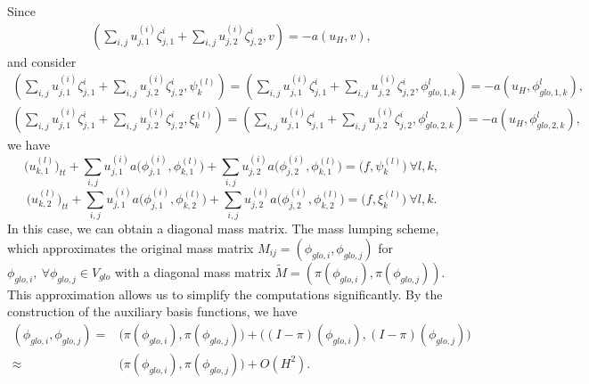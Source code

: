 \documentclass[preprint,12pt]{elsarticle}
\newcommand{\sff}[1]{{\color{orange}{#1}}}
\begin{document}
Since 
\begin{equation}\label{ml3}
\begin{aligned}
    \left(\sum_{i,j}u_{j,1}^{(i)}\zeta_{j,1}^i+\sum_{i,j}u_{j,2}^{(i)}\zeta_{j,2}^i,v\right)=-a(u_H,v),
\end{aligned}
\end{equation}
and consider
\begin{equation}\label{ml4}
\begin{aligned}
    \left(\sum_{i,j}u_{j,1}^{(i)}\zeta_{j,1}^i+\sum_{i,j}u_{j,2}^{(i)}\zeta_{j,2}^i,\psi_k^{(l)}\right)=\left(\sum_{i,j}u_{j,1}^{(i)}\zeta_{j,1}^i+\sum_{i,j}u_{j,2}^{(i)}\zeta_{j,2}^i,\phi_{glo,1,k}^{l}\right)=-a(u_H,\phi_{glo,1,k}^{l}),\\
    \left(\sum_{i,j}u_{j,1}^{(i)}\zeta_{j,1}^i+\sum_{i,j}u_{j,2}^{(i)}\zeta_{j,2}^i,\xi_k^{(l)}\right)=\left(\sum_{i,j}u_{j,1}^{(i)}\zeta_{j,1}^i+\sum_{i,j}u_{j,2}^{(i)}\zeta_{j,2}^i,\phi_{glo,2,k}^{l}\right)=-a(u_H,\phi_{glo,2,k}^{l}),
\end{aligned}
\end{equation}
we have
$$\Big(u_{k,1}^{(l)}\Big)_{tt}+\sum_{i,j}u_{j,1}^{(i)}a\Big(\phi_{j,1}^{(i)},\phi_{k,1}^{(l)}\Big)+\sum_{i,j}u_{j,2}^{(i)}a\Big(\phi_{j,2}^{(i)},\phi_{k,1}^{(l)}\Big)=\Big(f,\psi_k^{(l)}\Big) ~\forall l,k,$$
$$\Big(u_{k,2}^{(l)}\Big)_{tt}+\sum_{i,j}u_{j,1}^{(i)}a\Big(\phi_{j,1}^{(i)},\phi_{k,2}^{(l)}\Big)+\sum_{i,j}u_{j,2}^{(i)}a\Big(\phi_{j,2}^{(i)},\phi_{k,2}^{(l)}\Big)=\Big(f,\xi_k^{(l)}\Big) ~\forall l,k.$$
In this case, we can obtain a diagonal mass matrix. The mass lumping scheme, which approximates the original mass matrix $M_{ij}=(\phi_{glo,i},\phi_{glo,j})$ for $\phi_{glo,i},~\forall\phi_{glo,j}\in V_{glo}$ with a diagonal mass matrix $\tilde{M}=(\pi(\phi_{glo,i}),\pi(\phi_{glo,j}))$. This approximation allows us to simplify the computations significantly. By the construction of the auxiliary basis functions, we have 
\begin{equation}\label{masslumping}
\begin{aligned}
      (\phi_{glo,i},\phi_{glo,j})=&\big(\pi(\phi_{glo,i}),\pi(\phi_{glo,j})\big)+\big((I-\pi)(\phi_{glo,i}),(I-\pi)(\phi_{glo,j})\big)\\\approx&\big(\pi(\phi_{glo,i}),\pi(\phi_{glo,j})\big)+O(H^2).
\end{aligned}
\end{equation}


\end{document}
